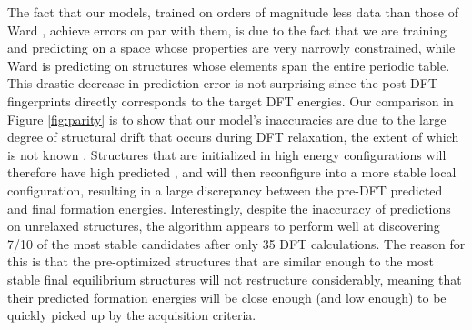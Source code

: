 The fact that our models,
trained on orders of magnitude less data than those of Ward ,
achieve errors on par with them,
is due to the fact that we are training and predicting on a space whose properties are very narrowly constrained, while Ward  is predicting on structures whose elements span the entire periodic table.
%
This drastic decrease in prediction error is not surprising since the post-DFT fingerprints directly corresponds to the target DFT energies.
%
Our comparison in Figure \ref{fig:parity} is to show that our model's inaccuracies are due to the large degree of structural drift that occurs during DFT relaxation,
the extent of which is not known .
%
Structures that are initialized in high energy configurations will therefore have high predicted \DHf,
and will then reconfigure into a more stable local configuration,
resulting in a large discrepancy between the pre-DFT predicted and final formation energies.
%
Interestingly, despite the inaccuracy of predictions on unrelaxed structures,
the algorithm appears to perform well at discovering \num{7/10} of the most stable candidates after only \num{35} DFT calculations.
%
The reason for this is that the pre-optimized structures that are similar enough to the most stable final equilibrium structures will not restructure considerably, meaning that their predicted formation energies will be close enough (and low enough) to be quickly picked up by the acquisition criteria.



